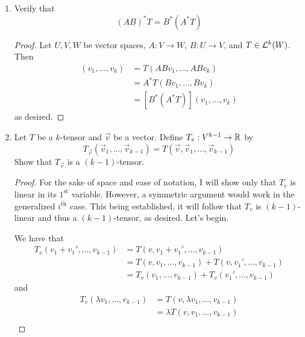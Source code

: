 \documentclass[../psets.tex]{subfiles}
\begin{document}
\begin{enumerate}[label={\textbf{1.3.\roman*.}}]
\begin{proof}
\begin{align*}
            &= (A^*T_1)(v_1,\dots,v_k)(A^*T_2)(v_{k+1},\dots,v_{k+\ell})\\
            &= [A^*(T_1)\otimes A^*(T_2)](v_1,\dots,v_{k+\ell})
        \end{align*}
        as desired.
    \end{proof}
    \item Verify that
    \begin{equation*}
        (AB)^*T = B^*(A^*T)
    \end{equation*}
    \begin{proof}
        Let $U,V,W$ be vector spaces, $A:V\to W$, $B:U\to V$, and $T\in\lin[k]{W}$. Then
        \begin{align*}
            [(AB)^*T](v_1,\dots,v_k) &= T(ABv_1,\dots,ABv_k)\\
            &= A^*T(Bv_1,\dots,Bv_k)\\
            &= [B^*(A^*T)](v_1,\dots,v_k)
        \end{align*}
        as desired.
    \end{proof}
    \setcounter{enumi}{6}
    \item Let $T$ be a $k$-tensor and $\vec{v}$ be a vector. Define $T_\vec{v}:V^{k-1}\to\R$ by
    \begin{equation*}
        T_\vec{v}(\vec{v}_1,\dots,\vec{v}_{k-1}) = T(\vec{v},\vec{v}_1,\dots,\vec{v}_{k-1})
    \end{equation*}
    Show that $T_\vec{v}$ is a $(k-1)$-tensor.
    \begin{proof}
        For the sake of space and ease of notation, I will show only that $T_v$ is linear in its $1^\text{st}$ variable. However, a symmetric argument would work in the generalized $i^\text{th}$ case. This being established, it will follow that $T_v$ is $(k-1)$-linear and thus a $(k-1)$-tensor, as desired. Let's begin.\par
        We have that
        \begin{align*}
            T_v(v_1+v_1',\dots,v_{k-1}) &= T(v,v_1+v_1',\dots,v_{k-1})\\
            &= T(v,v_1,\dots,v_{k-1})+T(v,v_1',\dots,v_{k-1})\\
            &= T_v(v_1,\dots,v_{k-1})+T_v(v_1',\dots,v_{k-1})
        \end{align*}
        and
        \begin{align*}
            T_v(\lambda v_1,\dots,v_{k-1}) &= T(v,\lambda v_1,\dots,v_{k-1})\\
            &= \lambda T(v,v_1,\dots,v_{k-1})\\

\end{align*}
\end{proof}
\end{enumerate}
\end{document}
